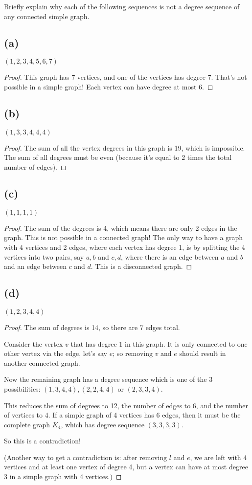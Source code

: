 \documentclass[14pt]{extarticle}
\begin{document}
Briefly explain why each of the following sequences is not a degree sequence of any connected simple graph.

\subsection{(a)}
$(1,2,3,4,5,6,7)$
\begin{proof}
This graph has 7 vertices, and one of the vertices has degree 7. That's not possible in a simple graph! Each vertex can have degree at most 6.
\end{proof}
\subsection{(b)}
$(1,3,3,4,4,4)$
\begin{proof}
The sum of all the vertex degrees in this graph is 19, which is impossible. The sum of all degrees must be even (because it's equal to 2 times the total number of edges).
\end{proof}
\subsection{(c)}
$(1,1,1,1)$
\begin{proof}
The sum of the degrees is 4, which means there are only 2 edges in the graph. This is not possible in a connected graph! The only way to have a graph with 4 vertices and 2 edges, where each vertex has degree 1, is  by splitting the 4 vertices into two pairs, say $a,b$ and $c,d$, where there is an edge between $a$ and $b$ and an edge between $c$ and $d$. This is a disconnected graph.
\end{proof}
\subsection{(d)}
$(1,2,3,4,4)$
\begin{proof}
The sum of degrees is 14, so there are 7 edges total.

Consider the vertex $v$ that has degree 1 in this graph. It is only connected to one other vertex via the edge, let's say $e$; so removing $v$ and $e$ should result in another connected graph.

Now the remaining graph has a degree sequence which is one of the 3 possibilities: $(1,3,4,4), (2,2,4,4)$ or $(2,3,3,4)$.

This reduces the sum of degrees to 12, the number of edges to 6, and the number of vertices to 4. If a simple graph of 4 vertices has 6 edges, then it must be the complete graph $K_4$, which has degree sequence $(3, 3, 3, 3)$.

So this is a contradiction!

(Another way to get a contradiction is: after removing $l$ and $e$, we are left with 4 vertices and at least one vertex of degree 4, but a vertex can have at most degree 3 in a simple graph with 4 vertices.)
\end{proof}
\end{document}
